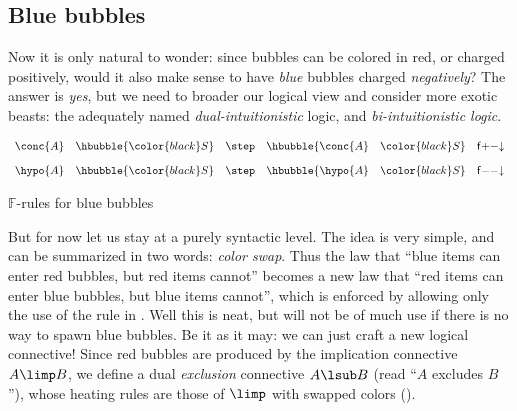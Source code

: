 \subsection{Blue bubbles}

Now it is only natural to wonder: since bubbles can be colored in red, or
charged positively, would it also make sense to have \emph{blue} bubbles charged
\emph{negatively}? The answer is \emph{yes}, but we need to broader our logical
view and consider more exotic beasts: the adequately named
\emph{dual-intuitionistic} logic, and \emph{bi-intuitionistic logic}.

\begin{marginfigure}
  $$
  \begin{array}{rclr}
    \conc{A}~~~\hbubble{\color{black}S} &\step &\hbubble{\conc{A}~~~\color{black}S} &\mathsf{f}{+}{-}{\downarrow} \vspace{1em}\\
    \hypo{A}~~~\hbubble{\color{black}S} &\step &\hbubble{\hypo{A}~~~\color{black}S} &\mathsf{f}{-}{-}{\downarrow} \\
  \end{array}
  $$
  \caption{$\mathbb{F}$-rules for blue bubbles}
\end{marginfigure}

But for now let us stay at a purely syntactic level. The idea is very simple,
and can be summarized in two words: \emph{color swap}. Thus the law that ``blue
items can enter red bubbles, but red items cannot'' becomes a new law that ``red
items can enter blue bubbles, but blue items cannot'', which is enforced by
allowing only the use of the {} rule in
. Well this is neat, but will not be of much use if
there is no way to spawn blue bubbles. Be it as it may: we can just craft a new
logical connective! Since red bubbles are produced by the implication connective
$A \limp B$, we define a dual \emph{exclusion} connective $A \lsub B$ (read
``$A$ excludes $B$''), whose heating rules are those of $\limp$ with swapped colors
().

